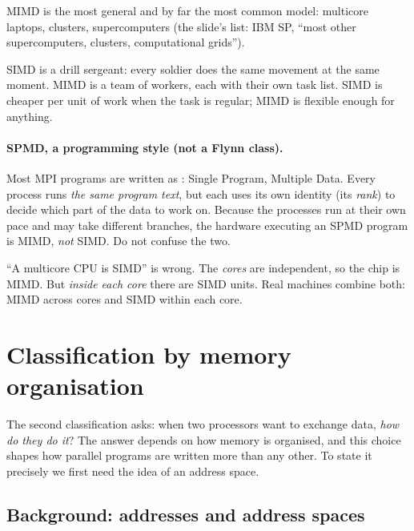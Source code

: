 MIMD is the most general and by far the most common model: multicore laptops, clusters,
supercomputers (the slide's list: IBM SP, ``most other supercomputers, clusters, computational grids'').

\begin{intuition}
SIMD is a drill sergeant: every soldier does the same movement at the same moment. MIMD is a team of
workers, each with their own task list. SIMD is cheaper per unit of work when the task is regular; MIMD is
flexible enough for anything.
\end{intuition}

\paragraph{SPMD, a programming style (not a Flynn class).}
Most MPI programs are written as : Single Program, Multiple Data. Every process runs
\emph{the same program text}, but each uses its own identity (its \emph{rank}) to decide which part of the data to work on.
Because the processes run at their own pace and may take different branches, the hardware executing an SPMD program is MIMD,
\emph{not} SIMD. Do not confuse the two.

\begin{pitfall}
``A multicore CPU is SIMD'' is wrong. The \emph{cores} are independent, so the chip is MIMD. But \emph{inside each
core} there are SIMD units. Real machines combine both: MIMD across cores and SIMD within each core.
\end{pitfall}

\section{Classification by memory organisation}

The second classification asks: when two processors want to exchange data, \emph{how do they do it}?
The answer depends on how memory is organised, and this choice shapes how parallel programs are written
more than any other. To state it precisely we first need the idea of an address space.

\subsection{Background: addresses and address spaces}

